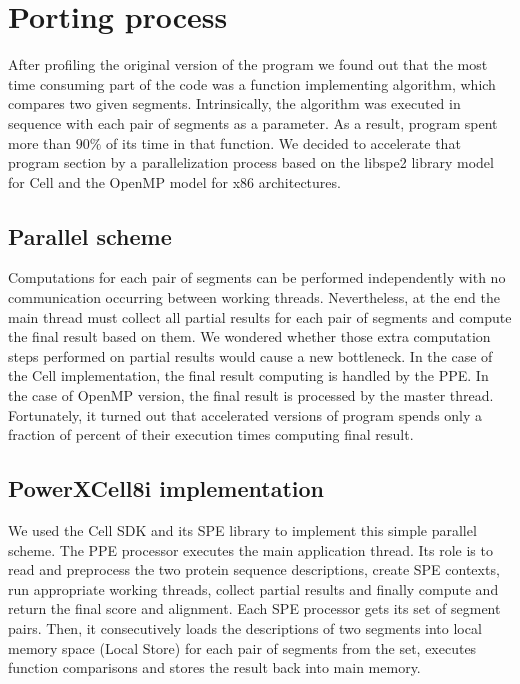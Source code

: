 \section{Porting process}
After profiling the original version of the \prog{} program we found out that
the most time consuming part of the code was a function implementing algorithm,
which compares two given segments.
Intrinsically, the algorithm was executed in sequence with each pair of segments as a
parameter.
As a result, program spent more than $90\%$ of its time in that function.
We decided to accelerate that program section by a parallelization process based on the libspe2 library model for Cell and the OpenMP model for x86 architectures.

\subsection{Parallel scheme}
Computations for each pair of segments can be performed independently with
no communication occurring between working threads.
Nevertheless, at the end the main thread must collect all partial results for
each pair of segments and compute the final result based on them.
We wondered whether those extra computation steps performed on partial results
would cause a new bottleneck.
In the case of the Cell implementation, the final result computing is handled by the PPE.
In the case of OpenMP version, the final result is processed by the master thread.
Fortunately, it turned out that accelerated versions of \prog{}
program spends only a fraction of percent of their execution times computing
final result.

\subsection{PowerXCell8i implementation}
We used the Cell SDK and its SPE library to implement this simple parallel
scheme.
The PPE processor executes the main application thread.
Its role is to read and preprocess the two protein sequence descriptions, create
SPE contexts, run appropriate working threads, collect partial results and
finally compute and return the final score and alignment.
Each SPE processor gets its set of segment pairs.
Then, it consecutively loads the descriptions of two segments into local memory space (Local Store) for each pair of segments from the set, executes function comparisons and stores the result back into main memory.

